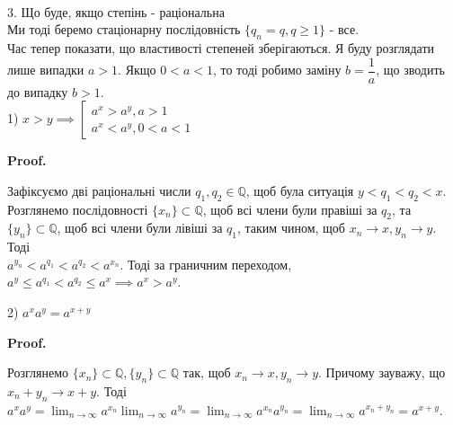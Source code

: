 \documentclass[a4paper, 14pt]{article}
\makeatletter
\def\huge{\displaystyle}
\def\qed{$\blacksquare$}
\theoremstyle{theoremdd}
\theoremstyle{theoremdd}
\theoremstyle{theoremdd}
\theoremstyle{theoremdd}
\theoremstyle{theoremdd}
\theoremstyle{theoremdd}
\theoremstyle{theoremdd}
\theoremstyle{theoremdd}
\renewenvironment{proof}[1][Proof.\\]{\par
\pushQED{\hfill \qed}%
\normalfont \topsep6\p@\@plus6\p@\relax
\trivlist
\item\relax
{\bfseries
#1\@addpunct{.}}\hspace\labelsep\ignorespaces
}{%
\popQED\endtrivlist\@endpefalse
}
\makeatother
\begin{document}
\bigskip \\
3. Що буде, якщо степінь - раціональна\\
Ми тоді беремо стаціонарну послідовність $\{q_n = q, q \geq 1\}$ - все.
\bigskip \\
Час тепер показати, що властивості степеней зберігаються. Я буду розглядати лише випадки $a > 1$. Якщо $0 < a < 1$, то тоді робимо заміну $b = \dfrac{1}{a}$, що зводить до випадку $b > 1$.\\
1) $x > y \implies \left[ \begin{gathered} a^{x} > a^{y}, a>1 \\ a^{x} < a^{y}, 0<a<1 \end{gathered} \right.$
\begin{proof}
Зафіксуємо дві раціональні числи $q_1,q_2 \in \mathbb{Q}$, щоб була ситуація $y < q_1 < q_2 < x$.\\
Розглянемо послідовності $\{x_n\} \subset \mathbb{Q}$, щоб всі члени були правіші за $q_2$, та $\{y_n\} \subset \mathbb{Q}$, щоб всі члени були лівіші за $q_1$, таким чином, щоб $x_n \to x, y_n \to y$. Тоді\\
$a^{y_n} < a^{q_1} < a^{q_2} < a^{x_n}$. Тоді за граничним переходом, $a^y \leq a^{q_1} < a^{q_2} \leq a^x \implies a^x > a^y$.
\end{proof}

2) $a^x a^y = a^{x+y}$
\begin{proof}
Розглянемо $\{x_n\} \subset \mathbb{Q}, \{y_n\} \subset \mathbb{Q}$ так, щоб $x_n \to x, y_n \to y$. Причому зауважу, що $x_n + y_n \to x +y$. Тоді $a^x a^y = \huge\lim_{n \to \infty} a^{x_n} \huge\lim_{n \to \infty} a^{y_n} = \huge\lim_{n \to \infty} a^{x_n} a^{y_n} = \huge\lim_{n \to \infty} a^{x_n+y_n} = a^{x+y}$.
\end{proof}
\end{document}
